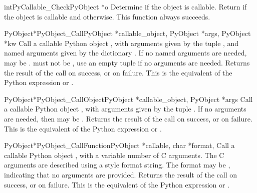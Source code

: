 \begin{cfuncdesc}{int}{PyCallable_Check}{PyObject *o}
  Determine if the object  is callable.  Return  if the
  object is callable and  otherwise.  This function always
  succeeds.
\end{cfuncdesc}


\begin{cfuncdesc}{PyObject*}{PyObject_Call}{PyObject *callable_object,
                                            PyObject *args,
                                            PyObject *kw}
  Call a callable Python object , with arguments
  given by the tuple , and named arguments given by the
  dictionary . If no named arguments are needed,  may
  be \NULL{}.  must not be \NULL{}, use an empty tuple if
  no arguments are needed. Returns the result of the call on success,
  or \NULL{} on failure.  This is the equivalent of the Python
  expression 
  or .
\end{cfuncdesc}


\begin{cfuncdesc}{PyObject*}{PyObject_CallObject}{PyObject *callable_object,
                                                  PyObject *args}
  Call a callable Python object , with arguments
  given by the tuple .  If no arguments are needed, then
   may be \NULL.  Returns the result of the call on
  success, or \NULL{} on failure.  This is the equivalent of the
  Python expression  or
  .
\end{cfuncdesc}

\begin{cfuncdesc}{PyObject*}{PyObject_CallFunction}{PyObject *callable,
                                                    char *format, \moreargs}
  Call a callable Python object , with a variable
  number of C arguments.  The C arguments are described using a
   style format string.  The format may be
  \NULL, indicating that no arguments are provided.  Returns the
  result of the call on success, or \NULL{} on failure.  This is the
  equivalent of the Python expression  or .
\end{cfuncdesc}


